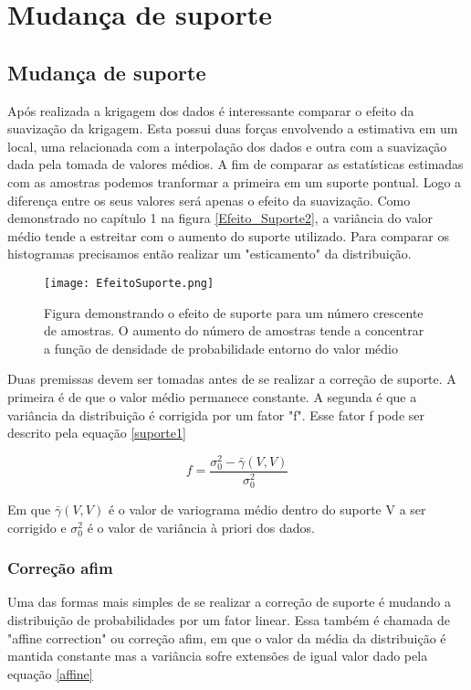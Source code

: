 \chapter{Mudança de suporte}


\section{Mudança de suporte}

Após realizada a krigagem dos dados é interessante comparar o efeito da suavização da krigagem. Esta possui duas forças envolvendo a estimativa em um local, uma relacionada com a interpolação dos dados e outra com a suavização dada pela tomada de valores médios. A fim de comparar as estatísticas estimadas com as amostras podemos tranformar a primeira em um suporte pontual. Logo a diferença entre os seus valores será apenas o efeito da suavização. Como demonstrado no capítulo 1 na figura \eqref{Efeito_Suporte2}, a variância do valor médio tende a estreitar com o aumento do suporte utilizado. Para comparar os histogramas precisamos então realizar um "esticamento" da distribuição.


\begin{figure}[H]
	\texttt{[image: EfeitoSuporte.png]}	
	\caption{Figura demonstrando o efeito de suporte para um número crescente de amostras. O aumento do número de amostras tende a concentrar a  função de densidade de probabilidade entorno do valor médio }
	\label{Efeito_Suporte2}
\end{figure} 

Duas premissas devem ser tomadas antes de se realizar a correção de suporte. A primeira é de que o valor médio permanece constante. A segunda é que a variância da distribuição é corrigida por um fator "f". Esse fator f pode ser descrito pela equação \eqref{suporte1}

\begin{equation}\label{suporte1}
	f= \frac{\sigma^2_{0} - \bar{\gamma}(V,V)}{\sigma^2_{0}}
\end{equation}

Em que $\bar{\gamma}(V,V)$ é o valor de variograma médio dentro do suporte V a ser corrigido e $\sigma^2_{0}$ é o valor de variância à priori dos dados. 

\subsection{Correção afim}

Uma das formas mais simples de se realizar a correção de suporte é mudando a distribuição de probabilidades por um fator linear. Essa também é chamada de "affine correction" ou correção afim, em que o valor da média da distribuição é mantida constante mas a variância sofre extensões de igual valor dado pela equação  \eqref{affine}

